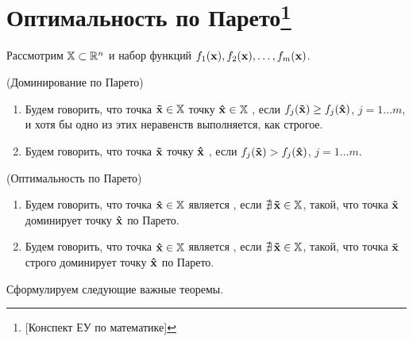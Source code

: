 \newpage

\section{Оптимальность по
Парето\protect\footnote{[Конспект ЕУ по математике]}}

Рассмотрим $\mathbb{X} \subset \mathbb{R}^n$ и набор функций $f_1(\mathbf{x}),
f_2(\mathbf{x}), \ldots, f_m(\mathbf{x})$.

\begin{dfn}(Доминирование по Парето)

\begin{enumerate}
\item Будем говорить, что точка $\mathbf{\tilde x} \in \mathbb{X}$  точку
$\mathbf{\hat x} \in \mathbb{X}$ , если $f_j(\mathbf{\tilde x})
\geq f_j(\mathbf{\hat x})$, $j=1 \ldots m$, и хотя бы одно из этих
неравенств выполняется, как строгое.

\item Будем говорить, что точка $\mathbf{\tilde x}$  точку
$\mathbf{\hat x}$ , если $f_j(\mathbf{\tilde x}) >
f_j(\mathbf{\hat x})$, $j=1 \ldots m$.
\end{enumerate}
\end{dfn}

\begin{dfn}(Оптимальность по Парето)

\begin{enumerate}

\item Будем говорить, что точка $\mathbf{\hat x} \in \mathbb{X}$ является , если $\nexists \,{\mathbf{\tilde x}} \in \mathbb{X}$, такой, что
точка $\mathbf{\tilde x}$ доминирует точку $\mathbf{\hat x}$ по Парето.

\item Будем говорить, что точка $\mathbf{\hat x} \in \mathbb{X}$ является , если $\nexists \,{\mathbf{\tilde x}} \in
\mathbb{X}$, такой, что точка $\mathbf{\tilde x}$ строго доминирует точку
$\mathbf{\hat x}$ по Парето.

\end{enumerate}
\end{dfn}

Сформулируем следующие важные теоремы.

